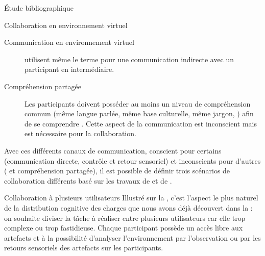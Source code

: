 \documentclass[myfrancais,ngerman,english,frenchb]{mythesis}
\begin{document}
\begin{mychapter}{Étude bibliographique}
\begin{mysection}{Collaboration en environnement virtuel}
\begin{mysubsection}{Communication en environnement virtuel}
\begin{description}
						 utilisent même le terme  pour une communication indirecte avec un participant en intermédiaire.
					\item[Compréhension partagée] Les participants doivent posséder au moins un niveau de compréhension commun (même langue parlée, même base culturelle, même jargon, \myetc) afin de se comprendre .
						Cette aspect de la communication est inconscient mais est nécessaire pour la collaboration.
				\end{description}
				Avec ces différents canaux de communication, conscient pour certains (communication directe, contrôle et retour sensoriel) et inconscients pour d'autres ( et compréhension partagée), il est possible de définir trois scénarios de collaboration différents basé sur les travaux de  et de .
				\begin{mysubsubsection}{Collaboration à plusieurs utilisateurs}
					Illustré sur la , c'est l'aspect le plus naturel de la distribution cognitive des charges que nous avons déjà découvert dans la  : on souhaite diviser la tâche à réaliser entre plusieurs utilisateurs car elle trop complexe ou trop fastidieuse.
					Chaque participant possède un accès libre aux artefacts et à la possibilité d'analyser l'environnement par l'observation ou par les retours sensoriels des artefacts sur les participants.


\end{mysubsubsection}
\end{mysubsection}
\end{mysection}
\end{mychapter}
\end{document}
